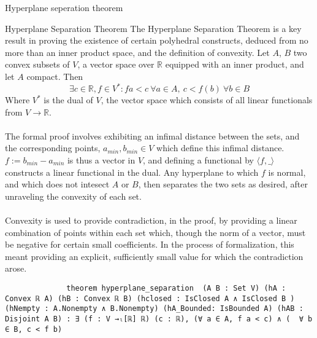 \documentclass[final]{beamer}
\newlength{\colwidth}
\begin{document}
\begin{frame}[fragile]
\begin{columns}[t]
\begin{column}{\colwidth}
            \begin{block}{Hyperplane seperation theorem}
                            \begin{alertblock}{Hyperplane Separation Theorem}
              The Hyperplane Separation Theorem is a key result in proving the existence of certain polyhedral constructs, deduced from no more than an inner product space, and the
              definition of convexity. Let $A$, $B$ two convex subsets of $V$, a vector space over $\mathbb{R}$ equipped with an inner product, and let $A$ compact. Then \begin{equation}
                \exists c\in \mathbb{R}, f \in V^*: fa < c\ \forall a\in A, \ c < f(b)\ \forall b\in B
              \end{equation} Where $V^*$ is the dual of $V$, the vector space which consists of all linear functionals from $V\to \mathbb{R}$.
              \\\\The formal proof involves exhibiting an infimal distance between the sets, and the corresponding points, $a_{min}, b_{min} \in V$ which define this infimal distance.
              $f:= b_{min}-a_{min}$ is thus a vector in $V$, and defining a functional by $\langle f, \_\rangle$ constructs a linear functional in the dual. Any hyperplane to which $f$
              is normal, and which does not intesect $A$ or $B$, then separates the two sets as desired, after unraveling the convexity of each set.
              \\\\Convexity is used to provide contradiction, in the proof, by providing a linear combination of points within each set which, though the norm of a vector,
              must be negative for certain small coefficients. In the process of formalization, this meant providing an explicit, sufficiently small value for which the contradiction arose.


              \begin{verbatim}
              theorem hyperplane_separation  (A B : Set V) (hA : Convex ℝ A) (hB : Convex ℝ B) (hclosed : IsClosed A ∧ IsClosed B ) (hNempty : A.Nonempty ∧ B.Nonempty) (hA_Bounded: IsBounded A) (hAB : Disjoint A B) : ∃ (f : V →ₗ[ℝ] ℝ) (c : ℝ), (∀ a ∈ A, f a < c) ∧ (  ∀ b ∈ B, c < f b)
            \end{verbatim}
             
            \end{alertblock}

            
             

\end{block}
\end{column}
\end{columns}
\end{frame}
\end{document}
